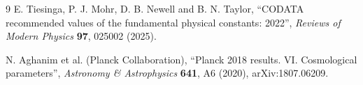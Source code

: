 \documentclass[11pt,a4paper]{article}
\begin{document}
\begin{thebibliography}{9}
E. Tiesinga, P. J. Mohr, D. B. Newell and B. N. Taylor,
``CODATA recommended values of the fundamental physical constants: 2022'',
\emph{Reviews of Modern Physics} \textbf{97}, 025002 (2025).

N. Aghanim et al. (Planck Collaboration),
``Planck 2018 results. VI. Cosmological parameters'',
\emph{Astronomy \& Astrophysics} \textbf{641}, A6 (2020),
arXiv:1807.06209.
\end{thebibliography}
\end{document}
